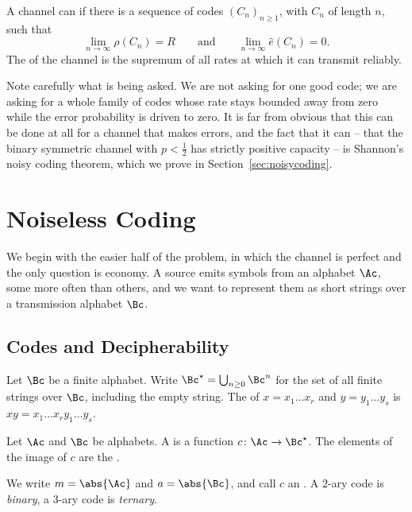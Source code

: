 \begin{definition}[Capacity]
	A channel can  if there is a sequence of codes $(C_n)_{n \ge 1}$, with $C_n$ of length $n$, such that
	$$\lim_{n \to \infty} \rho(C_n) = R \qquad \text{and} \qquad \lim_{n \to \infty} \hat e(C_n) = 0.$$
	The  of the channel is the supremum of all rates at which it can transmit reliably.
\end{definition}

Note carefully what is being asked. We are not asking for one good code; we are asking for a whole family of codes whose rate stays bounded away from zero while the error probability is driven to zero. It is far from obvious that this can be done at all for a channel that makes errors, and the fact that it can -- that the binary symmetric channel with $p< \tfrac12$ has strictly positive capacity -- is Shannon's noisy coding theorem, which we prove in Section~\ref{sec:noisycoding}.

\section{Noiseless Coding}

We begin with the easier half of the problem, in which the channel is perfect and the only question is economy. A source emits symbols from an alphabet $\Ac$, some more often than others, and we want to represent them as short strings over a transmission alphabet $\Bc$.

\subsection{Codes and Decipherability}

Let $\Bc$ be a finite alphabet. Write $\Bc^\star = \bigcup_{n \ge 0} \Bc^n$ for the set of all finite strings over $\Bc$, including the empty string. The  of $x = x_1 \dots x_r$ and $y = y_1 \dots y_s$ is $xy = x_1 \dots x_r y_1 \dots y_s$.

\begin{definition}[Code]
	Let $\Ac$ and $\Bc$ be alphabets. A  is a function $c \colon \Ac \to \Bc^\star$. The elements of the image of $c$ are the .
\end{definition}

We write $m = \abs{\Ac}$ and $a = \abs{\Bc}$, and call $c$ an . A $2$-ary code is \emph{binary}, a $3$-ary code is \emph{ternary}.

